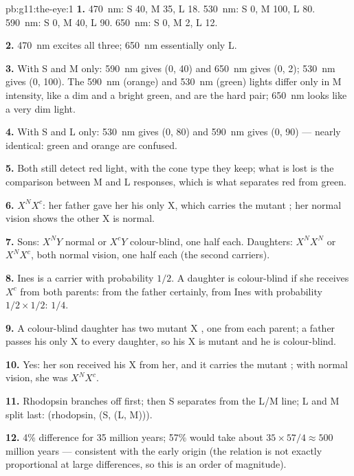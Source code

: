 \begin{solution}{pb:g11:the-eye:1}
\textbf{1.} \qty{470}{nm}: S 40, M 35, L 18. \qty{530}{nm}: S 0, M 100,
L 80. \qty{590}{nm}: S 0, M 40, L 90. \qty{650}{nm}: S 0, M 2, L 12.

\textbf{2.} \qty{470}{nm} excites all three; \qty{650}{nm} essentially
only L.

\textbf{3.} With S and M only: \qty{590}{nm} gives (0, 40) and
\qty{650}{nm} gives (0, 2); \qty{530}{nm} gives (0, 100). The
\qty{590}{nm} (orange) and \qty{530}{nm} (green) lights differ only in
M intensity, like a dim and a bright green, and are the hard pair;
\qty{650}{nm} looks like a very dim light.

\textbf{4.} With S and L only: \qty{530}{nm} gives (0, 80) and
\qty{590}{nm} gives (0, 90) --- nearly identical: green and orange are
confused.

\textbf{5.} Both still detect red light, with the cone type they
keep; what is lost is the comparison between M and L responses, which
is what separates red from green.

\textbf{6.} $X^NX^c$: her father gave her his only X, which carries
the mutant ; her normal vision shows the other X is normal.

\textbf{7.} Sons: $X^NY$ normal or $X^cY$ colour-blind, one half each.
Daughters: $X^NX^N$ or $X^NX^c$, both normal vision, one half each
(the second carriers).

\textbf{8.} Ines is a carrier with probability $1/2$. A daughter is
colour-blind if she receives $X^c$ from both parents: from the father
certainly, from Ines with probability $1/2 \times 1/2$: $1/4$.

\textbf{9.} A colour-blind daughter has two mutant X , one
from each parent; a father passes his only X to every daughter, so
his X is mutant and he is colour-blind.

\textbf{10.} Yes: her son received his X from her, and it carries the
mutant ; with normal vision, she was $X^NX^c$.

\textbf{11.} Rhodopsin branches off first; then S separates from the
L/M line; L and M split last: (rhodopsin, (S, (L, M))).

\textbf{12.} 4\% difference for 35 million years; 57\% would take
about $35 \times 57/4 \approx 500$ million years --- consistent with
the early  origin (the relation is not exactly proportional
at large differences, so this is an order of magnitude).


\end{solution}
